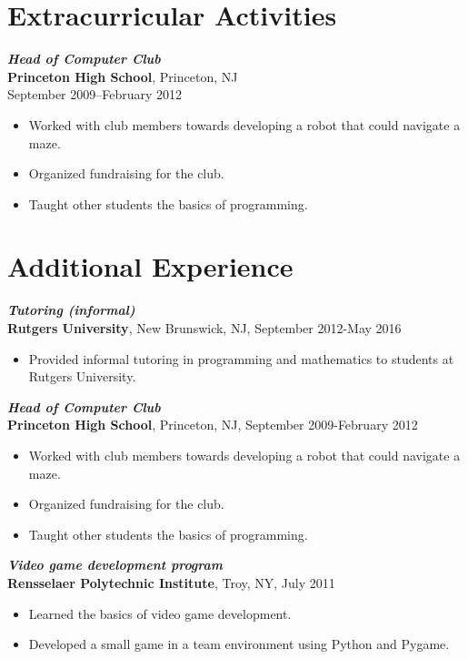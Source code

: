 \documentclass[letterpaper,12pt]{article}
\begin{document}
\section*{Extracurricular Activities}

\textit{\textbf{Head of Computer Club}} \\
\textbf{Princeton High School},
Princeton, NJ \\
September 2009--February 2012
\begin{itemize}
\item Worked with club members towards developing a robot that could
  navigate a maze.
\item Organized fundraising for the club.
\item Taught other students the basics of programming.
\end{itemize}

\iffalse
\section*{Additional Experience}

\textit{\textbf{Tutoring (informal)}} \\
\textbf{Rutgers University}, New Brunswick, NJ, September 2012-May
2016
\begin{itemize}
\item Provided informal tutoring in programming and mathematics to
  students at Rutgers University.
\end{itemize}

\textit{\textbf{Head of Computer Club}} \\
\textbf{Princeton High School}, Princeton, NJ, September 2009-February
2012
\begin{itemize}
\item Worked with club members towards developing a robot that could
  navigate a maze.
\item Organized fundraising for the club.
\item Taught other students the basics of programming.
\end{itemize}

\textit{\textbf{Video game development program}} \\
\textbf{Rensselaer Polytechnic Institute}, Troy, NY, July 2011
\begin{itemize}
\item Learned the basics of video game development.
\item Developed a small game in a team environment using Python and
  Pygame.
\end{itemize}
\end{document}
